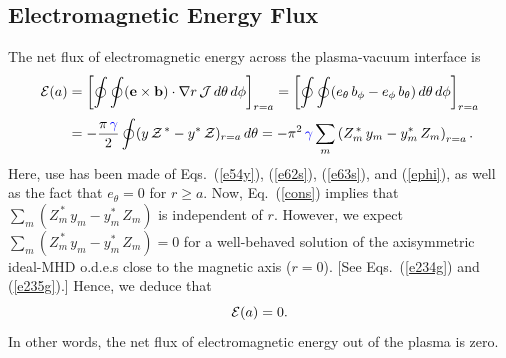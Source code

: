 \documentclass[12pt,prb,aps]{revtex4-1}
\begin{document}
\subsection{Electromagnetic Energy Flux}\label{efluxx}
The net flux of electromagnetic energy across the plasma-vacuum interface is 
\begin{align}\label{eflux}
{\cal E}(a) &= \left[\oint\oint ({\bf e}\times {\bf b})\cdot\nabla r\,{\cal J}\,d\theta\,d\phi\right]_{r=a}= \left[\oint\oint (e_\theta\,b_\phi-e_\phi\,b_\theta)\,d\theta\,d\phi\right]_{r=a}\nonumber\\[0.5ex]
&=-\frac{\pi\,\textcolor{blue}{\gamma}}{2}\oint (y\,{\cal Z}^{\,\ast}-y^\ast \,{\cal Z})_{r=a}\,d\theta=-\pi^2\,\textcolor{blue}{\gamma} \sum_{m}\left(Z_m^{\,\ast}\,y_m-y_m^\ast\,Z_m\right)_{r=a}.
\end{align}
Here, use has been made of Eqs.~(\ref{e54y}), (\ref{e62s}), (\ref{e63s}),  and  (\ref{ephi}), as well as  the fact that $e_\theta=0$ for $r\geq a$. 
 Now, Eq.~(\ref{cons}) implies that
$\sum_m(Z_m^{\,\ast}\,y_m-y_m^\ast\,Z_m)$ is independent of $r$. However, we expect $\sum_m(Z_m^{\,\ast}\,y_m-y_m^\ast\,Z_m)=0$ for a well-behaved
solution of the axisymmetric ideal-MHD o.d.e.s close to the magnetic axis ($r=0$). [See Eqs.~(\ref{e234g}) and (\ref{e235g}).] Hence, we deduce that
\begin{equation}\label{excons}
{\cal E}(a) = 0.
\end{equation}
In other words, the net flux of electromagnetic energy out of the plasma is zero. 
\end{document}
